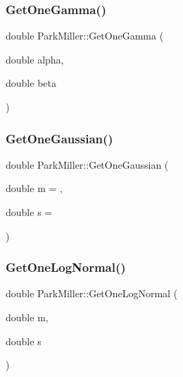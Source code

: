 \subsubsection{\texorpdfstring{Get\+One\+Gamma()}{GetOneGamma()}}
{\footnotesize\ttfamily double Park\+Miller\+::\+Get\+One\+Gamma (\begin{DoxyParamCaption}\item[{double}]{alpha,  }\item[{double}]{beta }\end{DoxyParamCaption})}

\hypertarget{classParkMiller_acf46034ebd112741d620c36c72b73d39}{}\label{classParkMiller_acf46034ebd112741d620c36c72b73d39} 
\subsubsection{\texorpdfstring{Get\+One\+Gaussian()}{GetOneGaussian()}}
{\footnotesize\ttfamily double Park\+Miller\+::\+Get\+One\+Gaussian (\begin{DoxyParamCaption}\item[{double}]{m = {},  }\item[{double}]{s = {} }\end{DoxyParamCaption})}

\hypertarget{classParkMiller_a812ca3d4d91694bdfa2453978c6324b3}{}\label{classParkMiller_a812ca3d4d91694bdfa2453978c6324b3} 
\subsubsection{\texorpdfstring{Get\+One\+Log\+Normal()}{GetOneLogNormal()}}
{\footnotesize\ttfamily double Park\+Miller\+::\+Get\+One\+Log\+Normal (\begin{DoxyParamCaption}\item[{double}]{m,  }\item[{double}]{s }\end{DoxyParamCaption})}

\hypertarget{classParkMiller_a442faf6c8b598b54295852e0c5c4a3c6}{}\label{classParkMiller_a442faf6c8b598b54295852e0c5c4a3c6} 
